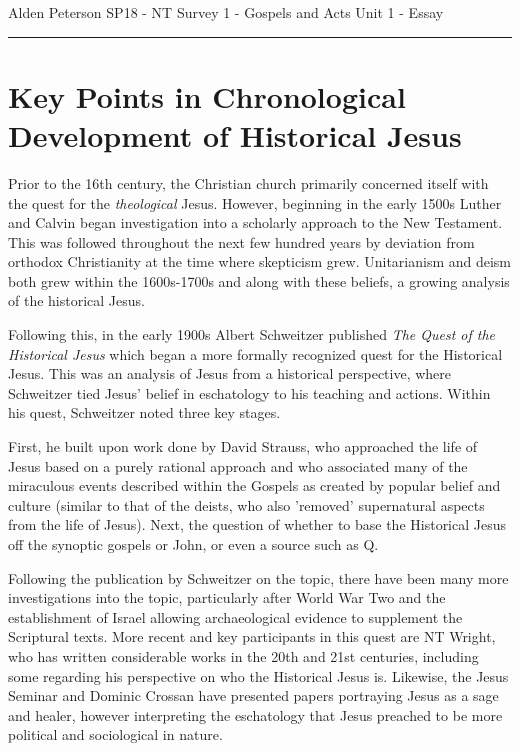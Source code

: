 \documentclass[12pt]{turabian-researchpaper}
\begin{document}
\begin{singlespace}
\noindent Alden Peterson \newline
\noindent SP18 - NT Survey 1 - Gospels and Acts\newline
\noindent Unit 1 - Essay  \newline
\noindent\rule{4cm}{0.4pt}
\end{singlespace}





\section{Key Points in Chronological Development of Historical Jesus}

Prior to the 16th century, the Christian church primarily concerned itself with the quest for the \textit{theological} Jesus. However, beginning in the early 1500s Luther and Calvin began investigation into a scholarly approach to the New Testament. This was followed throughout the next few hundred years by deviation from orthodox Christianity at the time where skepticism grew. Unitarianism and deism both grew within the 1600s-1700s and along with these beliefs, a growing analysis of the historical Jesus.

Following this, in the early 1900s Albert Schweitzer published \textit{The Quest of the Historical Jesus} which began a more formally recognized quest for the Historical Jesus. This was an analysis of Jesus from a historical perspective, where Schweitzer tied Jesus' belief in eschatology to his teaching and actions.  Within his quest, Schweitzer noted three key stages.

First, he built upon work done by David Strauss, who approached the life of Jesus based on a purely rational approach and who associated many of the miraculous events described within the Gospels as created by popular belief and culture (similar to that of the deists, who also 'removed' supernatural aspects from the life of Jesus). Next, the question of whether to base the Historical Jesus off the synoptic gospels or John, or even a source such as Q.

Following the publication by Schweitzer on the topic, there have been many more investigations into the topic, particularly after World War Two and the establishment of Israel allowing archaeological evidence to supplement the Scriptural texts. More recent and key participants in this quest are NT Wright, who has written considerable works in the 20th and 21st centuries, including some regarding his perspective on who the Historical Jesus is. Likewise, the Jesus Seminar and Dominic Crossan have presented papers portraying Jesus as a sage and healer, however interpreting the eschatology that Jesus preached to be more political and sociological in nature. 
\end{document}
